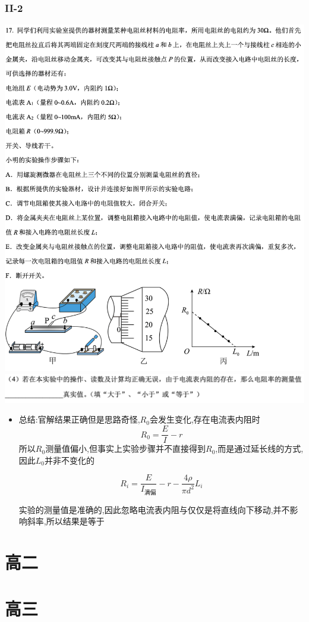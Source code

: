\documentclass{article}
\begin{document}
    \subsubsection{II-2}
    \includegraphics[width=50em,keepaspectratio]{./pictures/1.2-9.png}  \\
    \includegraphics[width=50em,keepaspectratio]{./pictures/1.2-10.png}

    \begin{itemize}
        \item 总结:\quad 官解结果正确但是思路奇怪,$R_{0}$会发生变化,存在电流表内阻时
              $$
              R_{0} = \frac{E}{I} - r
              $$
              所以$R_{0}$测量值偏小,但事实上实验步骤并不直接得到$R_{0}$,而是通过延长线的方式,因此$L_{0}$并非不变化的

              $$
              R_{i} = \frac{E}{I_{满偏}} - r -\frac{4\rho}{\pi d^{2}} L_{i}
              $$

              实验的测量值是准确的,因此忽略电流表内阻与仅仅是将直线向下移动,并不影响斜率,所以结果是等于
    \end{itemize}



    


    \section{高二}





    \section{高三}
\end{document}
